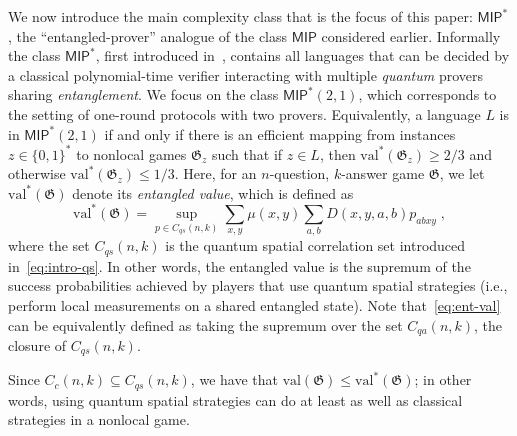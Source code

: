 \documentclass[11pt]{article}
\theoremstyle{definition}
\newcommand{\val}{\ensuremath{\mathrm{val}}}
\newcommand{\game}{\mathfrak{G}}
\newcommand{\class}[1]{\ensuremath{\mathsf{#1}}\xspace}
\newcommand{\MIP}{\class{MIP}} %
\begin{document}
We now introduce the main complexity class that is the focus of this paper: $\MIP^*$, the  ``entangled-prover'' analogue of the class $\MIP$ considered earlier. Informally the class $\MIP^*$, first introduced in~\cite{cleve2004consequences}, contains all languages that can be decided by a classical polynomial-time verifier interacting with multiple \emph{quantum} provers sharing \emph{entanglement}. We focus on the class $\MIP^*(2,1)$, which corresponds to the setting of one-round protocols with two  provers. Equivalently, a language $L$ is in $\MIP^*(2,1)$ if and only if there is an efficient mapping from instances $z\in\{0,1\}^*$ to nonlocal games $\game_z$ such that if $z \in L$, then $\val^*(\game_z) \geq 2/3$ and otherwise $\val^*(\game_z) \leq 1/3$. Here, for an $n$-question, $k$-answer game $\game$, we let $\val^*(\game)$ denote its \emph{entangled value}, which is defined as
\begin{equation}\label{eq:ent-val}
 \val^*(\game) = \sup_{p\in C_{qs}(n,k)} \sum_{x,y} \mu(x,y) \sum_{a,b} D(x,y,a,b) p_{abxy}\;,
\end{equation}
where the set $C_{qs}(n,k)$ is the quantum spatial correlation set introduced in~\eqref{eq:intro-qs}. In other words, the entangled value is the supremum of the success probabilities achieved by players that use quantum spatial strategies (i.e., perform local measurements on a shared entangled state). Note that~\eqref{eq:ent-val} can be equivalently defined as taking the supremum  over the set $C_{qa}(n,k)$, the closure of $C_{qs}(n,k)$.

Since $C_c(n,k) \subseteq C_{qs}(n,k)$, we have that $\val(\game) \leq \val^*(\game)$; in other words, using quantum spatial strategies can do at least as well as classical strategies in a nonlocal game. 

\end{document}
